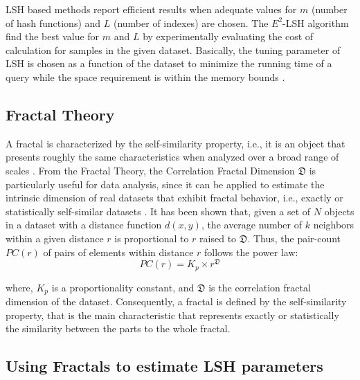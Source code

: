 \documentclass{article}
\begin{document}
LSH based methods report efficient results when adequate values for $m$ (number of hash functions) and $L$ (number of indexes) are chosen. The $E^2$-LSH algorithm find the best value for  $m$ and $L$ by experimentally evaluating the cost of calculation for samples in the given dataset.  Basically, the tuning parameter of LSH is chosen as a function of the dataset to minimize the running time  of a query  while the space requirement is within the memory bounds \cite{LSHBook}.  


\subsection{Fractal Theory}
 

A fractal is characterized by the self-similarity property, i.e., it is an object that presents roughly the same characteristics when analyzed over a broad range of scales \cite{DBLP:journals/jidm/TrainaTWF10}. From the Fractal Theory, the Correlation Fractal Dimension $\mathfrak{D}$ is particularly useful for data analysis, since it can be applied to estimate the intrinsic dimension of real datasets that exhibit fractal behavior, i.e., exactly or statistically self-similar datasets \cite{DBLP:fractal2016}.   It has been shown that, given a set of $N$ objects in a dataset with a distance function $d(x,y)$, the average number of $k$ neighbors within a given distance $r$ is proportional to $r$ raised to $\mathfrak{D}$. Thus, the pair-count $PC(r)$ of pairs of elements within distance $r$ follows the power law:
\begin{equation}\label{eq:fractal}
       PC(r) = K_p \times r^{\mathfrak{D}}
    \end{equation}

     where, $K_p$ is a proportionality constant, and $\mathfrak{D}$ is the correlation fractal dimension of the dataset.
    Consequently, a fractal is defined by the self-similarity property, that is the main characteristic that represents exactly or statistically  the similarity between the parts to the whole fractal.

 
\subsection{Using Fractals to estimate LSH parameters}

\end{document}
